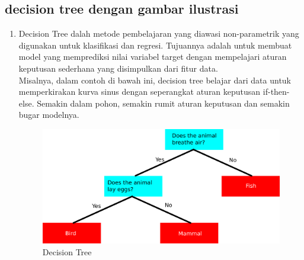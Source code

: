 \subsection{decision tree dengan gambar ilustrasi}
\begin{enumerate}
\item Decision Tree dalah metode pembelajaran yang diawasi non-parametrik yang digunakan untuk klasifikasi dan regresi. Tujuannya adalah untuk membuat model yang memprediksi nilai variabel target dengan mempelajari aturan keputusan sederhana yang disimpulkan dari fitur data.\\
Misalnya, dalam contoh di bawah ini, decision tree belajar dari data untuk memperkirakan kurva sinus dengan seperangkat aturan keputusan if-then-else. Semakin dalam pohon, semakin rumit aturan keputusan dan semakin bugar modelnya.
\begin{figure}[ht]
\centering
\includegraphics[scale=0.5]{figures/AFS/andri7.png}
\caption{Decision Tree}
\label{contoh}
\end{figure}
\end{enumerate}

